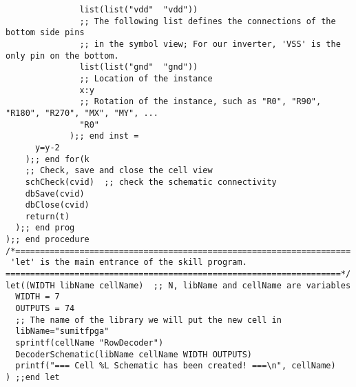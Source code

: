 \begin{lstlisting}
	  		   list(list("vdd"  "vdd")) 
			   ;; The following list defines the connections of the bottom side pins 
			   ;; in the symbol view; For our inverter, 'VSS' is the only pin on the bottom.
		       list(list("gnd"  "gnd"))		   
			   ;; Location of the instance
	           x:y 			   
			   ;; Rotation of the instance, such as "R0", "R90", "R180", "R270", "MX", "MY", ...
			   "R0"
			 );; end inst =	       
	  y=y-2	  
	);; end for(k
	;; Check, save and close the cell view
	schCheck(cvid)  ;; check the schematic connectivity
    dbSave(cvid)
    dbClose(cvid)	
    return(t)	
  );; end prog 
);; end procedure
/*====================================================================
 'let' is the main entrance of the skill program.
====================================================================*/
let((WIDTH libName cellName)  ;; N, libName and cellName are variables
  WIDTH = 7
  OUTPUTS = 74
  ;; The name of the library we will put the new cell in
  libName="sumitfpga"
  sprintf(cellName "RowDecoder")
  DecoderSchematic(libName cellName WIDTH OUTPUTS)
  printf("=== Cell %L Schematic has been created! ===\n", cellName)
) ;;end let
\end{lstlisting}
